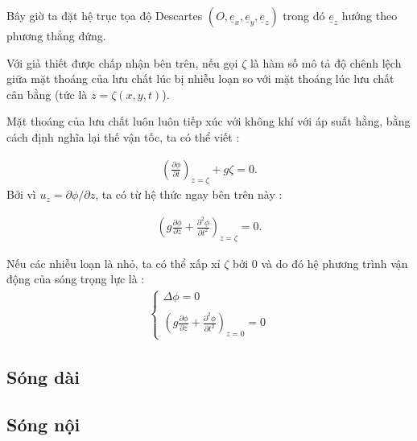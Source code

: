 \documentclass[CO_LUU_CHAT.tex]{subfiles}
\begin{document}
Bây giờ ta đặt hệ trục tọa độ Descartes $(O,\underline{e}_x, \underline{e}_y,\underline{e}_z)$ trong đó $\underline{e}_z$ hướng theo phương thẳng đứng.

Với giả thiết được chấp nhận bên trên, nếu gọi $\zeta$ là hàm số mô tả độ chênh lệch giữa mặt thoáng của lưu chất lúc bị nhiễu loạn so với mặt thoáng lúc lưu chất cân bằng (tức là $z=\zeta(x,y,t)$).

Mặt thoáng của lưu chất luôn luôn tiếp xúc với không khí với áp suất hằng, bằng cách định nghĩa lại thế vận tốc, ta có thể viết :

\begin{equation}
	\begin{aligned}
		\left(\frac{\partial\phi}{\partial t}\right)_{z=\zeta}+g\zeta=0.
	\end{aligned}
\end{equation}
Bởi vì $u_z=\partial\phi/\partial z$, ta có từ hệ thức ngay bên trên này :

\begin{equation}
	\begin{aligned}
		\left(g\frac{\partial\phi}{\partial z}+\frac{\partial^2\phi}{\partial t^2}\right)_{z=\zeta}=0.
	\end{aligned}
\end{equation}

Nếu các nhiễu loạn là nhỏ, ta có thể xấp xỉ $\zeta$ bởi $0$ và do đó hệ phương trình vận động của sóng trọng lực là :
\begin{equation}
	\begin{aligned}
		\left\{ {\begin{array}{*{20}{l}}
				{\Delta \phi  = 0}\\
				\\
				\displaystyle{{{\left( {g\frac{{\partial \phi }}{{\partial z}} + \frac{{{\partial ^2}\phi }}{{\partial {t^2}}}} \right)}_{z = 0}} = 0}
		\end{array}} \right.
	\end{aligned}
\end{equation}

\subsection{Sóng dài}


\subsection{Sóng nội}
\end{document}
